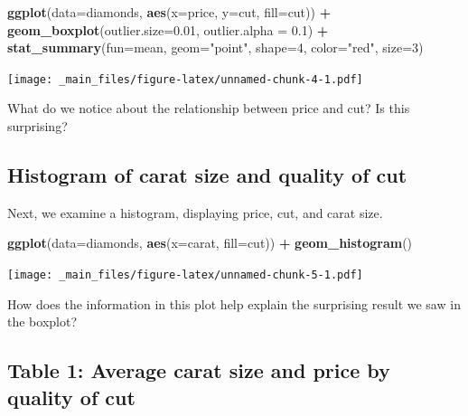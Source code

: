 \documentclass[]{book}
\newenvironment{Shaded}{\begin{snugshade}}{\end{snugshade}}
\newcommand{\KeywordTok}[1]{\textcolor[rgb]{0.13,0.29,0.53}{\textbf{#1}}}
\newcommand{\DataTypeTok}[1]{\textcolor[rgb]{0.13,0.29,0.53}{#1}}
\newcommand{\DecValTok}[1]{\textcolor[rgb]{0.00,0.00,0.81}{#1}}
\newcommand{\FloatTok}[1]{\textcolor[rgb]{0.00,0.00,0.81}{#1}}
\newcommand{\StringTok}[1]{\textcolor[rgb]{0.31,0.60,0.02}{#1}}
\newcommand{\OperatorTok}[1]{\textcolor[rgb]{0.81,0.36,0.00}{\textbf{#1}}}
\newcommand{\NormalTok}[1]{#1}
\begin{document}
\begin{Shaded}
\begin{Highlighting}[]
\KeywordTok{ggplot}\NormalTok{(}\DataTypeTok{data=}\NormalTok{diamonds, }\KeywordTok{aes}\NormalTok{(}\DataTypeTok{x=}\NormalTok{price, }\DataTypeTok{y=}\NormalTok{cut, }\DataTypeTok{fill=}\NormalTok{cut)) }\OperatorTok{+}\StringTok{ }
\StringTok{  }\KeywordTok{geom_boxplot}\NormalTok{(}\DataTypeTok{outlier.size=}\FloatTok{0.01}\NormalTok{, }\DataTypeTok{outlier.alpha =} \FloatTok{0.1}\NormalTok{) }\OperatorTok{+}\StringTok{ }
\StringTok{    }\KeywordTok{stat_summary}\NormalTok{(}\DataTypeTok{fun=}\NormalTok{mean, }\DataTypeTok{geom=}\StringTok{"point"}\NormalTok{, }\DataTypeTok{shape=}\DecValTok{4}\NormalTok{, }\DataTypeTok{color=}\StringTok{"red"}\NormalTok{, }\DataTypeTok{size=}\DecValTok{3}\NormalTok{)}
\end{Highlighting}
\end{Shaded}

\texttt{[image: \_main\_files/figure-latex/unnamed-chunk-4-1.pdf]}

What do we notice about the relationship between price and cut? Is this
surprising?

\subsection{Histogram of carat size and quality of
cut}\label{histogram-of-carat-size-and-quality-of-cut}

Next, we examine a histogram, displaying price, cut, and carat size.

\begin{Shaded}
\begin{Highlighting}[]
\KeywordTok{ggplot}\NormalTok{(}\DataTypeTok{data=}\NormalTok{diamonds, }\KeywordTok{aes}\NormalTok{(}\DataTypeTok{x=}\NormalTok{carat, }\DataTypeTok{fill=}\NormalTok{cut)) }\OperatorTok{+}\StringTok{ }\KeywordTok{geom_histogram}\NormalTok{()}
\end{Highlighting}
\end{Shaded}

\texttt{[image: \_main\_files/figure-latex/unnamed-chunk-5-1.pdf]}

How does the information in this plot help explain the surprising result
we saw in the boxplot?

\subsection{Table 1: Average carat size and price by quality of
cut}\label{table-1-average-carat-size-and-price-by-quality-of-cut}
\end{document}
